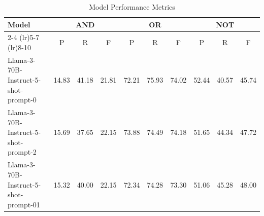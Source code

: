 \begin{table}[h]
\centering
\begin{tabular}{lccccccccc}
\toprule
Model & \multicolumn{3}{c}{AND} & \multicolumn{3}{c}{OR} & \multicolumn{3}{c}{NOT} \\
\cmidrule(lr){2-4}  \cmidrule(lr){5-7}  \cmidrule(lr){8-10}
 & P & R & F & P & R & F & P & R & F \\
\midrule
Llama-3-70B-Instruct-5-shot-prompt-0 & 14.83 & 41.18 & 21.81 & 72.21 & 75.93 & 74.02 & 52.44 & 40.57 & 45.74 \\
Llama-3-70B-Instruct-5-shot-prompt-2 & 15.69 & 37.65 & 22.15 & 73.88 & 74.49 & 74.18 & 51.65 & 44.34 & 47.72 \\
Llama-3-70B-Instruct-5-shot-prompt-01 & 15.32 & 40.00 & 22.15 & 72.34 & 74.28 & 73.30 & 51.06 & 45.28 & 48.00 \\
\bottomrule
\end{tabular}
\caption{Model Performance Metrics}
\label{tab:model_metrics}
\end{table}
